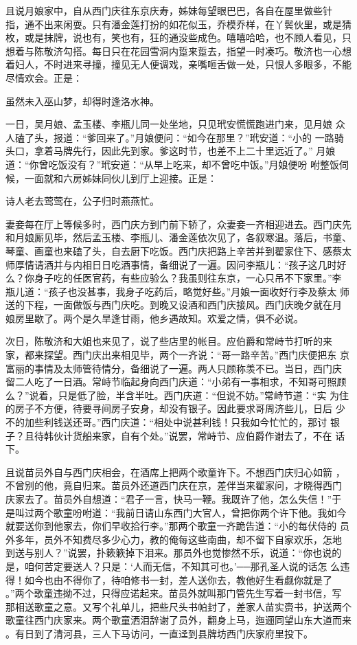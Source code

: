 且说月娘家中，自从西门庆往东京庆寿，姊妹每望眼巴巴，各自在屋里做些针
指，通不出来闲耍。只有潘金莲打扮的如花似玉，乔模乔样，在丫鬓伙里，或是猜
枚，或是抹牌，说也有，笑也有，狂的通没些成色。嘻嘻哈哈，也不顾人看见，只
想着与陈敬济勾搭。每日只在花园雪洞内踅来踅去，指望一时凑巧。敬济也一心想
着妇人，不时进来寻撞，撞见无人便调戏，亲嘴咂舌做一处，只恨人多眼多，不能
尽情欢会。正是：

虽然未入巫山梦，却得时逢洛水神。

一日，吴月娘、孟玉楼、李瓶儿同一处坐地，只见玳安慌慌跑进门来，见月娘
众人磕了头，报道：“爹回来了。”月娘便问：“如今在那里？”玳安道：“小的
一路骑头口，拿着马牌先行，因此先到家。爹这时节，也差不上二十里远近了。”
月娘道：“你曾吃饭没有？”玳安道：“从早上吃来，却不曾吃中饭。”月娘便吩
咐整饭伺候，一面就和六房姊妹同伙儿到厅上迎接。正是：

诗人老去莺莺在，公子归时燕燕忙。

妻妾每在厅上等候多时，西门庆方到门前下轿了，众妻妾一齐相迎进去。西门庆先
和月娘厮见毕，然后孟玉楼、李瓶儿、潘金莲依次见了，各叙寒温。落后，书童、
琴童、画童也来磕了头，自去厨下吃饭。西门庆把路上辛苦并到翟家住下、感蔡太
师厚情请酒并与内相日日吃酒事情，备细说了一遍。因问李瓶儿：“孩子这几时好
么？你身子吃的任医官药，有些应验么？我虽则往东京，一心只吊不下家里。”李
瓶儿道：“孩子也没甚事，我身子吃药后，略觉好些。”月娘一面收好行李及蔡太
师送的下程，一面做饭与西门庆吃。到晚又设酒和西门庆接风。西门庆晚夕就在月
娘房里歇了。两个是久旱逢甘雨，他乡遇故知。欢爱之情，俱不必说。

次日，陈敬济和大姐也来见了，说了些店里的帐目。应伯爵和常峙节打听的来
家，都来探望。西门庆出来相见毕，两个一齐说：“哥一路辛苦。”西门庆便把东
京富丽的事情及太师管待情分，备细说了一遍。两人只顾称羡不已。当日，西门庆
留二人吃了一日酒。常峙节临起身向西门庆道：“小弟有一事相求，不知哥可照顾
么？”说着，只是低了脸，半含半吐。西门庆道：“但说不妨。”常峙节道：“实
为住的房子不方便，待要寻间房子安身，却没有银子。因此要求哥周济些儿，日后
少不的加些利钱送还哥。”西门庆道：“相处中说甚利钱！只我如今忙忙的，那讨
银子？且待韩伙计货船来家，自有个处。”说罢，常峙节、应伯爵作谢去了，不在
话下。

且说苗员外自与西门庆相会，在酒席上把两个歌童许下。不想西门庆归心如箭
，不曾别的他，竟自归来。苗员外还道西门庆在京，差伴当来翟家问，才晓得西门
庆家去了。苗员外自想道：“君子一言，快马一鞭。我既许了他，怎么失信！”于
是叫过两个歌童吩咐道：“我前日请山东西门大官人，曾把你两个许下他。我如今
就要送你到他家去，你们早收拾行李。”那两个歌童一齐跪告道：“小的每伏侍的
员外多年，员外不知费尽多少心力，教的俺每这些南曲，却不留下自家欢乐，怎地
到送与别人？”说罢，扑簌簌掉下泪来。那员外也觉惨然不乐，说道：“你也说的
是，咱何苦定要送人？只是：‘人而无信，不知其可也。’──那孔圣人说的话怎
么违得！如今也由不得你了，待咱修书一封，差人送你去，教他好生看觑你就是了
。”两个歌童违拗不过，只得应诺起来。苗员外就叫那门管先生写着一封书信，写
那相送歌童之意。又写个礼单儿，把些尺头书帕封了，差家人苗实赍书，护送两个
歌童往西门庆家来。两个歌童洒泪辞谢了员外，翻身上马，迤逦同望山东大道而来
。有日到了清河县，三人下马访问，一直迳到县牌坊西门庆家府里投下。

